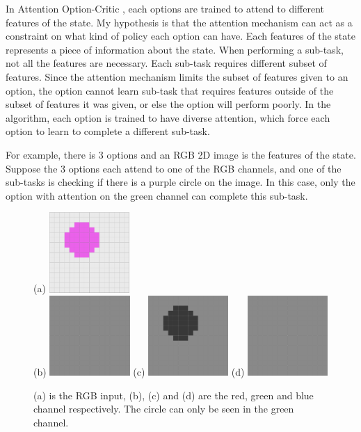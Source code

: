\documentclass{article}
\begin{document}
	\normalsize{\quad In Attention Option-Critic \cite{attentionoptioncritic}, each options are trained to attend to different features of the state. My hypothesis is that the attention mechanism can act as a constraint on what kind of policy each option can have. Each features of the state represents a piece of information about the state. When performing a sub-task, not all the features are necessary. Each sub-task requires different subset of features. Since the attention mechanism limits the subset of features given to an option, the option cannot learn sub-task that requires features outside of the subset of features it was given, or else the option will perform poorly. In the algorithm, each option is trained to have diverse attention, which force each option to learn to complete a different sub-task.
		
	\quad For example, there is 3 options and an RGB 2D image is the features of the state. Suppose the 3 options each attend to one of the RGB channels, and one of the sub-tasks is checking if there is a purple circle on the image. In this case, only the option with attention on the green channel can complete this sub-task.}
	\begin{figure}[h]
		\centering
		\large{(a)}
		\includegraphics[width=1.2in]{rgb.png}\\
		\large{(b)}
		\includegraphics[width=1.2in]{rb.png}
		\hspace{0.2in}
		\large{(c)}
		\includegraphics[width=1.2in]{g.png}
		\hspace{0.2in}
		\large{(d)}
		\includegraphics[width=1.2in]{rb.png}
		\caption{(a) is the RGB input, (b), (c) and (d) are the red, green and blue channel respectively. The circle can only be seen in the green channel.}
	\end{figure}\vspace{0.15in}\\
\end{document}

